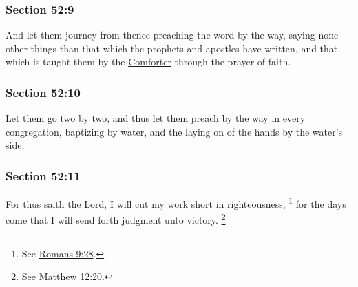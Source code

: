 	\subsubsection{Section 52:9} %
		\label{DC52-9}

		And let them journey from thence preaching the word by the way, saying none other things than that which the prophets and apostles have written, and that which is taught them by the \hyperref[COMFORTER]{Comforter} through the prayer of faith.


	\subsubsection{Section 52:10} %
		\label{DC52-10}

		Let them go two by two, and thus let them preach by the way in every congregation, baptizing by water, and the laying on of the hands by the water's side.


	\subsubsection{Section 52:11} %
		\label{DC52-11}

		For thus saith the Lord, I will cut my work short in righteousness,%
			\footnote{%
				See \hyperref[ROMANS-9-28]{Romans 9:28}.
				} 
		for the days come that I will send forth judgment unto victory.%
			\footnote{%
				See \hyperref[MATTHEW-12-20]{Matthew 12:20}.
				}

